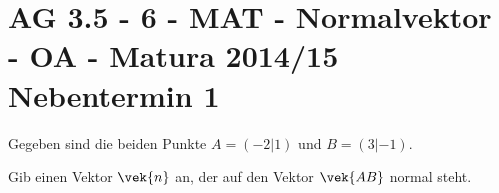 \section{AG 3.5 - 6 - MAT - Normalvektor - OA - Matura 2014/15 Nebentermin 1}

\begin{beispiel}[AG 3.5]{1} %
Gegeben sind die beiden Punkte $A=(-2|1)$ und $B=(3|-1)$. \leer

Gib einen Vektor $\vek{n}$ an, der auf den Vektor $\vek{AB}$ normal steht. 

\end{beispiel}